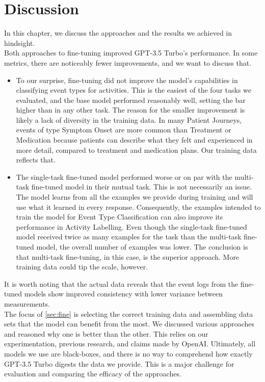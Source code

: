 \section{Discussion}\label{sec:discussion}
In this chapter, we discuss the approaches and the results we achieved in hindsight.\\
Both approaches to fine-tuning improved GPT-3.5 Turbo's performance. In some metrics, there are noticeably fewer improvements, and we want to discuss that.\\
\begin{itemize}[partopsep=0pt, topsep=0pt]
    \item To our surprise, fine-tuning did not improve the model's capabilities in classifying event types for activities. This is the easiest of the four tasks we evaluated, and the base model performed reasonably well, setting the bar higher than in any other task. The reason for the smaller improvement is likely a lack of diversity in the training data. In many Patient Journeys, events of type Symptom Onset are more common than Treatment or Medication because patients can describe what they felt and experienced in more detail, compared to treatment and medication plans. Our training data reflects that.
    \item The single-task fine-tuned model performed worse or on par with the multi-task fine-tuned model in their mutual task. This is not necessarily an issue. The model learns from all the examples we provide during training and will use what it learned in every response. Consequently, the examples intended to train the model for Event Type Classification can also improve its performance in Activity Labelling. Even though the single-task fine-tuned model received twice as many examples for the task  than the multi-task fine-tuned model, the overall number of examples was lower. The conclusion is that multi-task fine-tuning, in this case, is the superior approach. More training data could tip the scale, however.
\end{itemize}
It is worth noting that the actual data reveals that the event logs from the fine-tuned models show improved consistency with lower variance between measurements.\\
The focus of \autoref{sec:fine} is selecting the correct training data and assembling data sets that the model can benefit from the most. We discussed various approaches and reasoned why one is better than the other. This relies on our experimentation, previous research, and claims made by OpenAI. Ultimately, all models we use are black-boxes, and there is no way to comprehend how exactly GPT-3.5 Turbo digests the data we provide. This is a major challenge for evaluation and comparing the efficacy of the approaches.